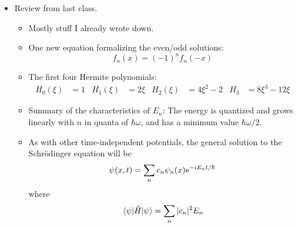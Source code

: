 \documentclass[../notes.tex]{subfiles}
\begin{document}
\begin{itemize}
\begin{itemize}
    \end{itemize}
    \item Review from last class.
    \begin{itemize}
        \item Mostly stuff I already wrote down.
        \item One new equation formalizing the even/odd solutions:
        \begin{equation*}
            f_n(x) = (-1)^nf_n(-x)
        \end{equation*}
        \item The first four Hermite polynomials:
        \begin{align*}
            H_0(\xi) &= 1&
            H_1(\xi) &= 2\xi&
            H_2(\xi) &= 4\xi^2-2&
            H_3 &= 8\xi^3-12\xi
        \end{align*}
        \item Summary of the characteristics of $E_n$: The energy is quantized and grows linearly with $n$ in quanta of $\hbar\omega$, and has a minimum value $\hbar\omega/2$.
        \item As with other time-independent potentials, the general solution to the Schr\"{o}dinger equation will be
        \begin{equation*}
            \psi(x,t) = \sum_nc_n\psi_n(x)\e[-iE_nt/\hbar]
        \end{equation*}
        where
        \begin{equation*}
            \ev{\hat{H}}{\psi} = \sum_n|c_n|^2E_n
        \end{equation*}
    \end{itemize}
\end{itemize}
\end{document}
